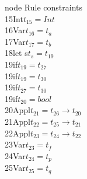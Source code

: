 \documentclass{article}
\begin{document}
\begin{multicols}{3}
\noindent
node\hspace{0.5cm} Rule \hspace{1cm}constraints\\
15\hspace{1cm}Int\hspace{1.4cm}$t_{15} = Int$\\
16\hspace{1cm}Var\hspace{1cm}$t_{16} = t_a$\\
17\hspace{1cm}Var\hspace{1.3cm}$t_{17} = t_b$\\
18\hspace{1cm}let s\hspace{1.2cm}$t_s = t_{19}$\\
19\hspace{1cm}if\hspace{1.6cm}$t_{19} = t_{27}$\\
19\hspace{1cm}if\hspace{1.6cm}$t_{19} = t_{30}$\\
19\hspace{1cm}if\hspace{1.6cm}$t_{27} = t_{30}$\\
19\hspace{1cm}if\hspace{1.6cm}$t_{20} = bool$\\
20\hspace{1cm}Appl\hspace{1cm}$t_{21} = t_{26} \rightarrow t_{20}$\\
21\hspace{1cm}Appl\hspace{1cm}$t_{22} = t_{25} \rightarrow t_{21}$\\
22\hspace{1cm}Appl\hspace{1cm}$t_{23} = t_{24} \rightarrow t_{22}$\\
23\hspace{1cm}Var\hspace{1.2cm}$t_{23} = t_f$\\
24\hspace{1cm}Var\hspace{1.2cm}$t_{24} = t_p$\\
25\hspace{1cm}Var\hspace{1.2cm}$t_{25} = t_q$\\

\end{multicols}
\end{document}
